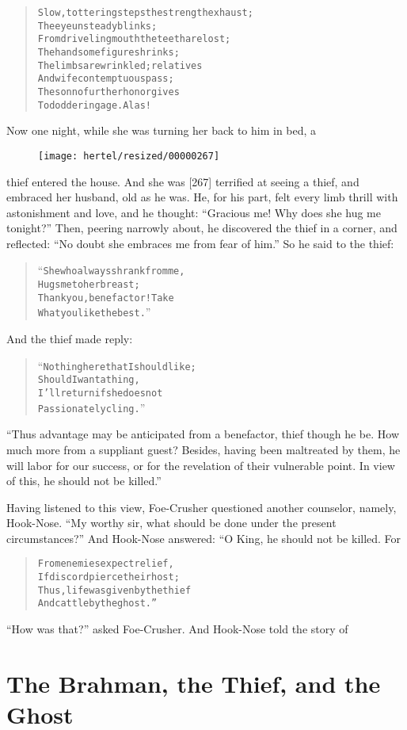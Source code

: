\documentclass[article, twoside, 10pt]{memoir}
\renewenvironment{verbatim}{%
\begin{quote}%
\vskip -10pt%
\begin{alltt}\normalfont\small}{\end{alltt}%
\end{quote}%
\vskip -10pt
} %
\begin{document}
\begin{verbatim}
Slow, tottering steps the strength exhaust;
    The eye unsteady blinks;
From driveling mouth the teeth are lost;
    The handsome figure shrinks;
The limbs are wrinkled; relatives
    And wife contemptuous pass;
The son no further honor gives
    To doddering age. Alas!
\end{verbatim}
Now one night, while she was turning her back to him in bed, a
\begin{figure}[p]\texttt{[image: hertel/resized/00000267]}\end{figure}thief entered the house. And she was [267] terrified at seeing a
thief, and embraced her husband, old as he was. He, for his part,
felt every limb thrill with astonishment and love, and he thought:
``Gracious me! Why does she hug me tonight?'' Then, peering
narrowly about, he discovered the thief in a corner, and reflected:
``No doubt she embraces me from fear of him.'' So he said to the
thief:

\begin{verbatim}
“She who always shrank from me,
Hugs me to her breast;
Thank you, benefactor! Take
What you like the best.”
\end{verbatim}
And the thief made reply:

\begin{verbatim}
“Nothing here that I should like;
Should I want a thing,
I'll return if she does not
Passionately cling.”
\end{verbatim}
``Thus advantage may be anticipated from a benefactor, thief though he be. How much more from a suppliant guest? Besides, having been maltreated by them, he will labor for our success, or for the revelation of their vulnerable point. In view of this, he should not be killed.''

Having listened to this view, Foe-Crusher questioned another
counselor, namely, Hook-Nose.
``My worthy sir, what should be done under the present circumstances?''
And Hook-Nose answered: “O King, he should not be killed. For

\begin{verbatim}
From enemies expect relief,
    If discord pierce their host;
Thus, life was given by the thief
    And cattle by the ghost.”
\end{verbatim}
``How was that?'' asked Foe-Crusher. And Hook-Nose told the story
of

\chapter{The Brahman, the Thief, and the Ghost}
\end{document}
